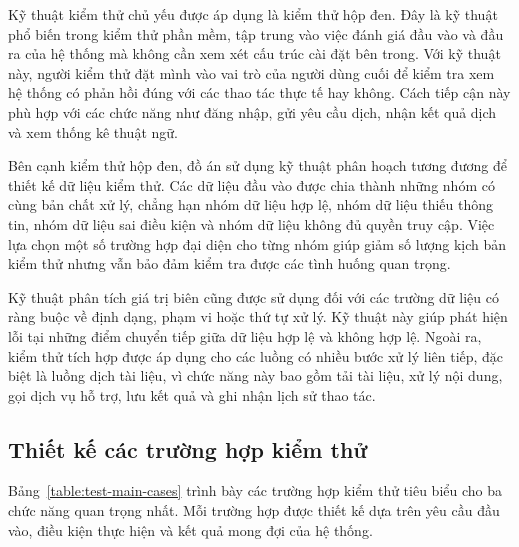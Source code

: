 ﻿\documentclass[../DoAn.tex]{subfiles}
\begin{document}
Kỹ thuật kiểm thử chủ yếu được áp dụng là kiểm thử hộp đen. Đây là kỹ thuật phổ biến trong kiểm thử phần mềm, tập trung vào việc đánh giá đầu vào và đầu ra của hệ thống mà không cần xem xét cấu trúc cài đặt bên trong. Với kỹ thuật này, người kiểm thử đặt mình vào vai trò của người dùng cuối để kiểm tra xem hệ thống có phản hồi đúng với các thao tác thực tế hay không. Cách tiếp cận này phù hợp với các chức năng như đăng nhập, gửi yêu cầu dịch, nhận kết quả dịch và xem thống kê thuật ngữ.

Bên cạnh kiểm thử hộp đen, đồ án sử dụng kỹ thuật phân hoạch tương đương để thiết kế dữ liệu kiểm thử. Các dữ liệu đầu vào được chia thành những nhóm có cùng bản chất xử lý, chẳng hạn nhóm dữ liệu hợp lệ, nhóm dữ liệu thiếu thông tin, nhóm dữ liệu sai điều kiện và nhóm dữ liệu không đủ quyền truy cập. Việc lựa chọn một số trường hợp đại diện cho từng nhóm giúp giảm số lượng kịch bản kiểm thử nhưng vẫn bảo đảm kiểm tra được các tình huống quan trọng.

Kỹ thuật phân tích giá trị biên cũng được sử dụng đối với các trường dữ liệu có ràng buộc về định dạng, phạm vi hoặc thứ tự xử lý. Kỹ thuật này giúp phát hiện lỗi tại những điểm chuyển tiếp giữa dữ liệu hợp lệ và không hợp lệ. Ngoài ra, kiểm thử tích hợp được áp dụng cho các luồng có nhiều bước xử lý liên tiếp, đặc biệt là luồng dịch tài liệu, vì chức năng này bao gồm tải tài liệu, xử lý nội dung, gọi dịch vụ hỗ trợ, lưu kết quả và ghi nhận lịch sử thao tác.

\subsection{Thiết kế các trường hợp kiểm thử}

Bảng~\ref{table:test-main-cases} trình bày các trường hợp kiểm thử tiêu biểu cho ba chức năng quan trọng nhất. Mỗi trường hợp được thiết kế dựa trên yêu cầu đầu vào, điều kiện thực hiện và kết quả mong đợi của hệ thống.
\end{document}

